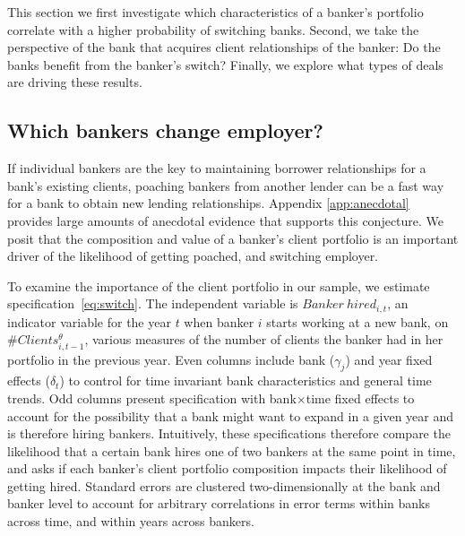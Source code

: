This section we first investigate which characteristics of a banker's portfolio correlate with a higher probability of switching banks. Second, we take the perspective of the bank that acquires client relationships of the banker: Do the banks benefit from the banker's switch? Finally, we explore what types of deals are driving these results. 

\subsection{Which bankers change employer?}

If individual bankers are the key to maintaining borrower relationships for a bank's existing clients, poaching bankers from another lender can be a fast way for a bank to obtain new lending relationships. Appendix \ref{app:anecdotal} provides large amounts of anecdotal evidence that supports this conjecture. %
We posit that the composition and value of a banker's client portfolio is an important driver of the likelihood of getting poached, and switching employer. 

To examine the importance of the client portfolio in our sample, we estimate specification~\ref{eq:switch}. The independent variable is $Banker~hired_{i,t}$, an indicator variable for the year $t$ when banker $i$ starts working at a new bank, on $\#Clients^{\theta}_{i,t-1}$, various measures of the number of clients the banker had in her portfolio in the previous year. %
Even columns include bank ($\gamma_{j}$) and year fixed effects ($\delta_{t}$) to control for time invariant bank characteristics and general time trends. Odd columns present specification with bank$\times$time fixed effects to account for the possibility that a bank might want to expand in a given year and is therefore hiring bankers. Intuitively, these specifications therefore compare the likelihood that a certain bank hires one of two bankers at the same point in time, and asks if each banker's client portfolio composition impacts their likelihood of getting hired. Standard errors are clustered two-dimensionally at the bank and banker level to account for arbitrary correlations in error terms within banks across time, and within years across bankers.

